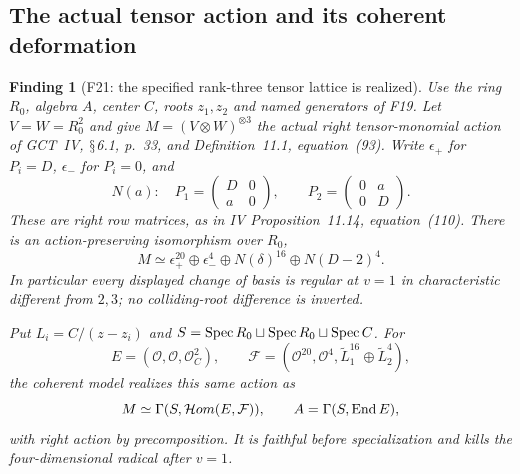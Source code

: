 \documentclass[11pt,a4paper]{article}
\renewcommand{\S}{\ensuremath{\mathsection}}
\newcommand{\fid}[1]{\textsf{#1}}\newcommand{\gate}[1]{\textsf{#1}}
\theoremstyle{named}\newtheorem{finding}{Finding}[section]
\theoremstyle{definition}\newtheorem{definition}[finding]{Definition}
\theoremstyle{remark}\newtheorem{remark}[finding]{Remark}
\begin{document}
\subsection{The actual tensor action and its coherent deformation}
\begin{finding}[\fid{F21}: the specified rank-three tensor lattice is realized]\label{f:r3tensor}
Use the ring $R_0$, algebra $A$, center $C$, roots $z_1,z_2$ and named
generators of \fid{F19}. Let $V=W=R_0^2$ and give
$M=(V\otimes W)^{\otimes3}$ the actual right tensor-monomial action of
GCT~IV, \S6.1, p.~33, and Definition~11.1, equation~(93). Write
$\epsilon_+$ for $P_i=D$, $\epsilon_-$ for $P_i=0$, and
\[
 N(a):\quad P_1=\begin{pmatrix}D&0\\a&0\end{pmatrix},\qquad
 P_2=\begin{pmatrix}0&a\\0&D\end{pmatrix}.
\]
These are right row matrices, as in IV Proposition~11.14,
equation~(110). There is an action-preserving isomorphism over $R_0$,
\begin{equation}\label{eq:r3tensor}
 M\simeq\epsilon_+^{20}\oplus\epsilon_-^4
       \oplus N(\delta)^{16}\oplus N(D-2)^4.
\end{equation}
In particular every displayed change of basis is regular at $v=1$ in
characteristic different from $2,3$; no colliding-root difference is inverted.

Put $L_i=C/(z-z_i)$ and
$S=\operatorname{Spec} R_0\sqcup\operatorname{Spec} R_0\sqcup\operatorname{Spec} C$. For
\[
 E=(\mathcal O,\mathcal O,\mathcal O_C^2),\qquad
 \mathcal F=(\mathcal O^{20},\mathcal O^4,
             \widetilde L_1^{16}\oplus\widetilde L_2^4),
\]
the coherent model realizes this same action as
\[
 M\simeq\Gamma(S,\mathcal Hom(E,\mathcal F)),\qquad A=\Gamma(S,\operatorname{End} E),
\]
with right action by precomposition. It is faithful before specialization
and kills the four-dimensional radical after $v=1$.
\end{finding}
\end{document}
